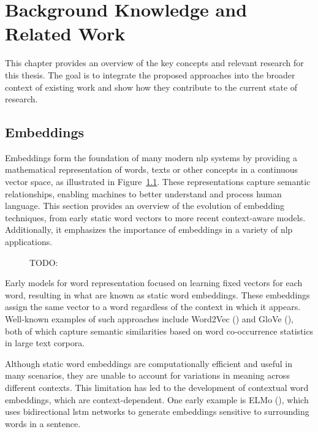 \chapter{Background Knowledge and Related Work}
\label{sec:background}

This chapter provides an overview of the key concepts and relevant research for this thesis. The goal is to integrate the proposed approaches into the broader context of existing work and show how they contribute to the current state of research.

\section{Embeddings}
\label{sec:background:embeddings}
Embeddings form the foundation of many modern \ac{nlp} systems by providing a mathematical representation of words, texts or other concepts in a continuous vector space, as illustrated in Figure~\ref{fig:embeddings}. These representations capture semantic relationships, enabling machines to better understand and process human language. This section provides an overview of the evolution of embedding techniques, from early static word vectors to more recent context-aware models. Additionally, it emphasizes the importance of embeddings in a variety of \ac{nlp} applications.

\begin{figure}[ht]
  \begin{center}
    
  \end{center}
  \caption{TODO:}
  \label{fig:embeddings} %
\end{figure}

Early models for word representation focused on learning fixed vectors for each word, resulting in what are known as static word embeddings. These embeddings assign the same vector to a word regardless of the context in which it appears. Well-known examples of such approaches include Word2Vec (\cite{mikolovEfficientEstimationWord2013}) and GloVe (\cite{penningtonGloveGlobalVectors2014}), both of which capture semantic similarities based on word co-occurrence statistics in large text corpora.

Although static word embeddings are computationally efficient and useful in many scenarios, they are unable to account for variations in meaning across different contexts. This limitation has led to the development of contextual word embeddings, which are context-dependent. One early example is ELMo (\cite{petersDeepContextualizedWord2018}), which uses bidirectional \ac{lstm} networks to generate embeddings sensitive to surrounding words in a sentence.

